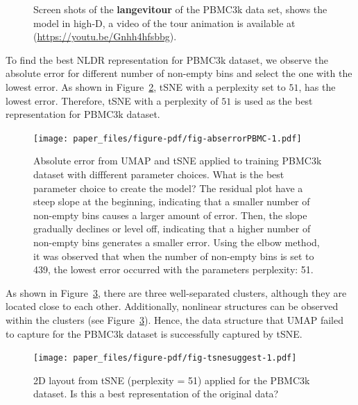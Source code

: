\documentclass[
  12pt]{article}
\begin{document}
\begin{figure}[H]
\begin{minipage}[t]{0.33\linewidth}
{{}

}

\subcaption{\label{fig-pbmc1_sc3}}
\end{minipage}%

\caption{\label{fig-pbmc1_sc}Screen shots of the \textbf{langevitour} of
the PBMC3k data set, shows the model in high-D, a video of the tour
animation is available at (\url{https://youtu.be/Gnhh4hfsbbg}).}

\end{figure}

To find the best NLDR representation for PBMC3k dataset, we observe the
absolute error for different number of non-empty bins and select the one
with the lowest error. As shown in Figure~\ref{fig-abserrorPBMC}, tSNE
with a perplexity set to \(51\), has the lowest error. Therefore, tSNE
with a perplexity of \(51\) is used as the best representation for
PBMC3k dataset.

\begin{figure}[H]

{\centering \texttt{[image: paper\_files/figure-pdf/fig-abserrorPBMC-1.pdf]}

}

\caption{\label{fig-abserrorPBMC}Absolute error from UMAP and tSNE
applied to training PBMC3k dataset with diffferent parameter choices.
What is the best parameter choice to create the model? The residual plot
have a steep slope at the beginning, indicating that a smaller number of
non-empty bins causes a larger amount of error. Then, the slope
gradually declines or level off, indicating that a higher number of
non-empty bins generates a smaller error. Using the elbow method, it was
observed that when the number of non-empty bins is set to 439, the
lowest error occurred with the parameters perplexity: 51.}

\end{figure}

As shown in Figure~\ref{fig-tsnesuggest}, there are three well-separated
clusters, although they are located close to each other. Additionally,
nonlinear structures can be observed within the clusters (see
Figure~\ref{fig-tsnesuggest}). Hence, the data structure that UMAP
failed to capture for the PBMC3k dataset is successfully captured by
tSNE.

\begin{figure}[H]

{\centering \texttt{[image: paper\_files/figure-pdf/fig-tsnesuggest-1.pdf]}

}

\caption{\label{fig-tsnesuggest}2D layout from tSNE (perplexity = 51)
applied for the PBMC3k dataset. Is this a best representation of the
original data?}

\end{figure}
\end{document}
